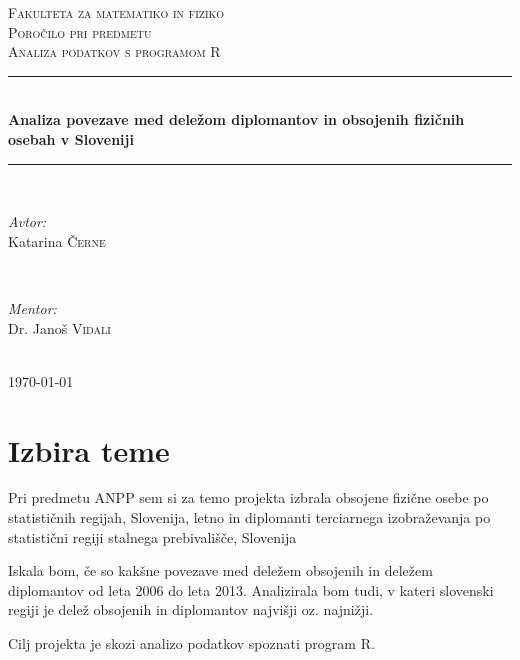 \documentclass[11pt,a4paper]{article}
\begin{document}
\begin{titlepage}
\newcommand{\HRule}{\rule{\linewidth}{0.5mm}}
\center
\textsc{\LARGE Fakulteta za matematiko in fiziko}\\[3 cm]
\textsc{\Large Poročilo pri predmetu}\\[0.5cm]
\textsc{\large Analiza podatkov s programom R}\\[2 cm]
\HRule \\[0.4cm]
{ \huge \bfseries Analiza povezave med deležom diplomantov in obsojenih fizičnih osebah v Sloveniji}\\[0.4cm]
\HRule \\[6 cm]
\begin{minipage}{0.4\textwidth}
\begin{flushleft} \large
\emph{Avtor:}\\
Katarina \textsc{Černe}
\end{flushleft}
\end{minipage}
~
\begin{minipage}{0.4\textwidth}
\begin{flushright} \large
\emph{Mentor:} \\
Dr. Janoš \textsc{Vidali}
\end{flushright}
\end{minipage}\\[2 cm]
{\large \today}\\[3cm]
\end{titlepage}


\section{Izbira teme}
Pri predmetu ANPP sem si za temo projekta izbrala obsojene fizične osebe po statističnih regijah, Slovenija, letno in diplomanti terciarnega izobraževanja po statistični regiji stalnega prebivališče, Slovenija

Iskala bom, če so kakšne povezave med deležem obsojenih in deležem diplomantov od leta 2006 do leta 2013. Analizirala bom tudi, v kateri slovenski regiji je delež obsojenih in diplomantov najvišji oz. najnižji.

Cilj projekta je skozi analizo podatkov spoznati program R.
\end{document}
